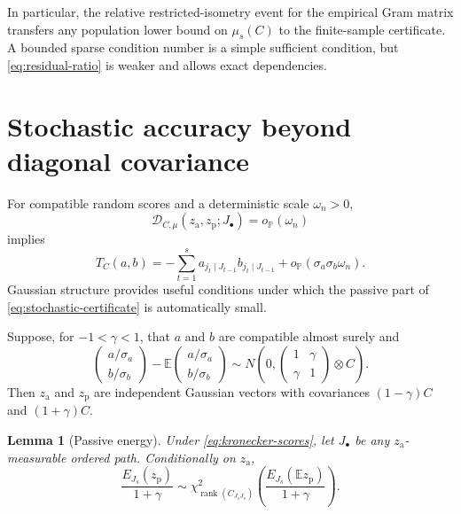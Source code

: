 \documentclass[a4paper,11pt,english]{article}
\newtheorem{lemma}[theorem]{Lemma}
\newcommand{\E}{\mathbb E}
\newcommand{\Prob}{\mathbb P}
\begin{document}
In particular, the relative restricted-isometry event for the empirical
Gram matrix transfers any population lower bound on $\mu_s(C)$ to the
finite-sample certificate.  A bounded sparse condition number is a simple
sufficient condition, but \eqref{eq:residual-ratio} is weaker and allows
exact dependencies.

\section{Stochastic accuracy beyond diagonal covariance}

For compatible random scores and a deterministic scale $\omega_n>0$,
\begin{equation}\label{eq:stochastic-certificate}
        \mathcal D_{C,\mu}(z_{\mathrm a},z_{\mathrm p};J_\bullet)=o_{\Prob}(\omega_n)
\end{equation}
implies
\begin{equation}\label{eq:stochastic-products}
        T_C(a,b)
        =-\sum_{t=1}^s
        a_{j_t\mid J_{t-1}}b_{j_t\mid J_{t-1}}
        +o_{\Prob}(\sigma_a\sigma_b\omega_n).
\end{equation}
Gaussian structure provides useful conditions under which the passive
part of \eqref{eq:stochastic-certificate} is automatically small.

Suppose, for $-1<\gamma<1$, that $a$ and $b$ are compatible almost surely
and
\begin{equation}\label{eq:kronecker-scores}
        \begin{pmatrix}a/\sigma_a\\b/\sigma_b\end{pmatrix}
        -\E\begin{pmatrix}a/\sigma_a\\b/\sigma_b\end{pmatrix}
        \sim N\!\left(
        0,
        \begin{pmatrix}1&\gamma\\\gamma&1\end{pmatrix}\otimes C
        \right).
\end{equation}
Then $z_{\mathrm a}$ and $z_{\mathrm p}$ are independent Gaussian vectors with covariances
$(1-\gamma)C$ and $(1+\gamma)C$.

\begin{lemma}[Passive energy]
\label{lem:passive-energy}
Under \eqref{eq:kronecker-scores}, let $J_\bullet$ be any
$z_{\mathrm a}$-measurable ordered path.  Conditionally on $z_{\mathrm a}$,
\begin{equation}\label{eq:passive-chi-square}
        \frac{E_{J_s}(z_{\mathrm p})}{1+\gamma}
        \sim\chi^2_{\operatorname{rank}(C_{J_sJ_s})}
        \left(
        \frac{E_{J_s}(\E z_{\mathrm p})}{1+\gamma}
        \right).
\end{equation}
\end{lemma}
\end{document}
